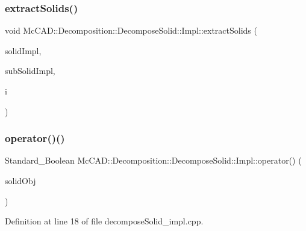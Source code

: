 \subsubsection{\texorpdfstring{extract\+Solids()}{extractSolids()}\hspace{0.1cm}{\footnotesize\ttfamily [2/2]}}
{\footnotesize\ttfamily void Mc\+C\+A\+D\+::\+Decomposition\+::\+Decompose\+Solid\+::\+Impl\+::extract\+Solids (\begin{DoxyParamCaption}\item[{\hyperlink{classMcCAD_1_1Geometry_1_1Solid_1_1Impl}{Geometry\+::\+Solid\+::\+Impl} \&}]{solid\+Impl,  }\item[{const \hyperlink{classMcCAD_1_1Geometry_1_1Solid_1_1Impl}{Geometry\+::\+Solid\+::\+Impl} \&}]{sub\+Solid\+Impl,  }\item[{Standard\+\_\+\+Integer \&}]{i }\end{DoxyParamCaption})}

\mbox{\label{classMcCAD_1_1Decomposition_1_1DecomposeSolid_1_1Impl_a72113129aea63c20631338a8f5d4022b}} 
\subsubsection{\texorpdfstring{operator()()}{operator()()}\hspace{0.1cm}{\footnotesize\ttfamily [1/6]}}
{\footnotesize\ttfamily Standard\+\_\+\+Boolean Mc\+C\+A\+D\+::\+Decomposition\+::\+Decompose\+Solid\+::\+Impl\+::operator() (\begin{DoxyParamCaption}\item[{std\+::shared\+\_\+ptr$<$ \hyperlink{classMcCAD_1_1Geometry_1_1PLSolid}{Geometry\+::\+P\+L\+Solid} $>$ \&}]{solid\+Obj }\end{DoxyParamCaption})}



Definition at line 18 of file decompose\+Solid\+\_\+impl.\+cpp.


